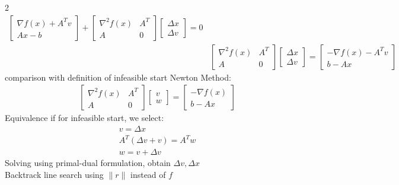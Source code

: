 \documentclass[8pt]{extarticle}
\newcommand{\norm}[1]{\|#1\|}
\begin{document}
\begin{multicols*}{2}
\begin{align*}
\begin{bmatrix}
      \nabla f(x) + A^Tv\\
      Ax-b
    \end{bmatrix} + 
    \begin{bmatrix}
        \nabla^2 f(x) & A^T\\
        A & 0
    \end{bmatrix}
    \begin{bmatrix}
      \Delta x\\ \Delta v
    \end{bmatrix} = 0\\
    &\begin{bmatrix}
        \nabla^2 f(x) & A^T\\
        A & 0
    \end{bmatrix}
    \begin{bmatrix}
      \Delta x\\ \Delta v
    \end{bmatrix} =
    \begin{bmatrix}
      -\nabla f(x) - A^Tv\\
      b-Ax
    \end{bmatrix}
  \end{align*}
  comparison with definition of infeasible start Newton Method:
  \begin{align*}
    &\begin{bmatrix}
      \nabla^2 f(x) & A^T \\
      A & 0 
    \end{bmatrix}
          \begin{bmatrix}
            v\\ w
          \end{bmatrix}=
    \begin{bmatrix}
      -\nabla f(x)\\
      b-Ax
    \end{bmatrix}
  \end{align*}
  Equivalence if for infeasible start, we select:
  \begin{align*}
    &v = \Delta x\\
    &A^T(\Delta v + v) = A^T w\\
    &w = v + \Delta v
  \end{align*}
  Solving using primal-dual formulation, obtain $\Delta v, \Delta x$\\
  Backtrack line search using $\norm{r}$ instead of $f$\\


\end{multicols*}
\end{document}
